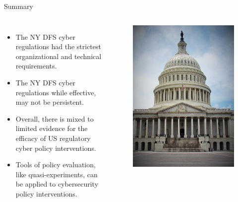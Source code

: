 \documentclass[10pt]{beamer}
\begin{document}
\begin{frame}{Summary}
\begin{columns}
    \begin{itemize}
    \item The NY DFS cyber regulations had the strictest organizational and technical requirements.
    \item The NY DFS cyber regulations while effective, may not be persistent.
    \item Overall, there is mixed to limited evidence for the efficacy of US regulatory cyber policy  interventions.
    \item Tools of policy evaluation, like quasi-experiments, can be applied to cybersecurity policy interventions.
    \end{itemize}
    
    \begin{figure}
	\includegraphics[width=\textwidth]{Figures/us-capitol.jpg}
    \end{figure}  
\end{columns}
\end{frame}
\end{document}
